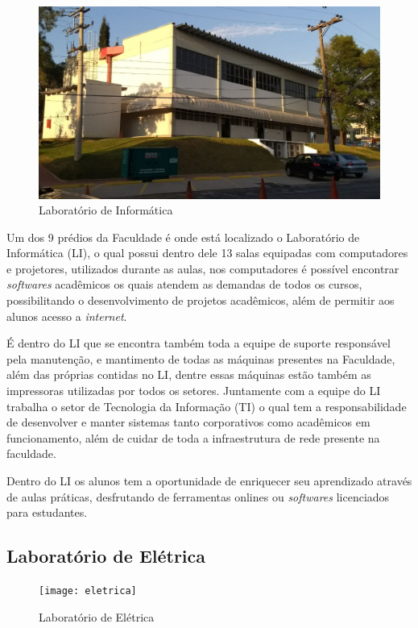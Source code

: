 \documentclass[
	12pt,				%
	oneside,			%
	a4paper,			%
	chapter=TITLE,		%
	section=TITLE,		%
	sumario=tradicional %
	english,			%
	french,				%
	spanish,			%
	brazil				%
	]{abntex2}
\begin{document}
\begin{figure}[htb]
	\caption{\label{fig:li} Laboratório de Informática}
	\begin{center}
		\includegraphics[scale=0.3]{li}
	\end{center}
\end{figure}

Um dos 9 prédios da Faculdade é onde está localizado o Laboratório de Informática (LI), o qual possui dentro dele 13 salas equipadas com computadores e projetores, utilizados durante as aulas, nos computadores é possível encontrar \textit{softwares} acadêmicos os quais atendem as demandas de todos os cursos, possibilitando o desenvolvimento de projetos acadêmicos, além de permitir aos alunos acesso a \textit{internet}.

É dentro do LI que se encontra também toda a equipe de suporte responsável pela manutenção, e mantimento de todas as máquinas presentes na Faculdade, além das próprias contidas no LI, dentre essas máquinas estão também as impressoras utilizadas por todos os setores. Juntamente com a equipe do LI trabalha o setor de Tecnologia da Informação (TI) o qual tem a responsabilidade de desenvolver e manter sistemas tanto corporativos como acadêmicos em funcionamento, além de cuidar de toda a infraestrutura de rede presente na faculdade.

Dentro do LI os alunos tem a oportunidade de enriquecer seu aprendizado através de aulas práticas, desfrutando de ferramentas onlines ou \textit{softwares} licenciados para estudantes.

\subsection*{Laboratório de Elétrica}

\begin{figure}[htb]
	\caption{\label{fig:eletrica} Laboratório de Elétrica}
	\begin{center}
		\texttt{[image: eletrica]}
	\end{center}
\end{figure}
\end{document}
